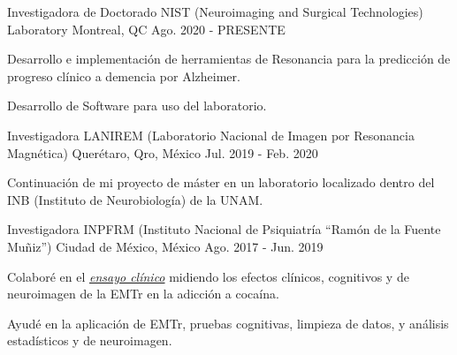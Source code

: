 \vspace{-3.2mm}
\vspace{-1.5mm}
\begin{cventries}
    \cventry
        {Investigadora de Doctorado}
        {NIST (Neuroimaging and Surgical Technologies) Laboratory}
        {Montreal, QC}
        {Ago. 2020 - PRESENTE}
        {
            \begin{cvitems}
                \item {Desarrollo e implementación de herramientas de
                  Resonancia para la predicción de progreso clínico a demencia
                  por Alzheimer.}
                \item {Desarrollo de Software para uso del laboratorio.}
            \end{cvitems}
        }
    \cventry
        {Investigadora}
        {LANIREM (Laboratorio Nacional de Imagen por Resonancia Magnética)}
        {Querétaro, Qro, México}
        {Jul. 2019 - Feb. 2020}
        {
            \begin{cvitems}
                \item {Continuación de mi proyecto de máster en un laboratorio localizado dentro del INB (Instituto de Neurobiología) de la UNAM.}
            \end{cvitems}
        }
    \cventry
        {Investigadora}
        {INPFRM (Instituto Nacional de Psiquiatría ``Ramón de la Fuente Muñiz'')}
        {Ciudad de México, México}
        {Ago. 2017 - Jun. 2019}
        {
            \begin{cvitems}
            \item {Colaboré en el \href{https://clinicaltrials.gov/ct2/show/study/NCT02986438?term=Jorge+Gonzalez-Olvera&cntry=MX&rank=2}{\textit{ensayo clínico}} midiendo los efectos clínicos, cognitivos y de neuroimagen de la EMTr en la adicción a cocaína.}
            \item {Ayudé en la aplicación de EMTr, pruebas cognitivas, limpieza de datos, y análisis estadísticos y de neuroimagen.}

\end{cvitems}}
\end{cventries}
